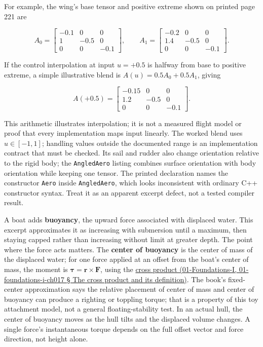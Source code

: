 For example, the wing's base tensor and positive extreme shown on printed page 221 are

\[
A_0=\begin{bmatrix}-0.1&0&0\\1&-0.5&0\\0&0&-0.1\end{bmatrix},\qquad
A_1=\begin{bmatrix}-0.2&0&0\\1.4&-0.5&0\\0&0&-0.1\end{bmatrix}.
\]

If the control interpolation at input \(u=+0.5\) is halfway from base to positive extreme, a simple illustrative blend is \(A(u)=0.5A_0+0.5A_1\), giving

\[
A(+0.5)=\begin{bmatrix}-0.15&0&0\\1.2&-0.5&0\\0&0&-0.1\end{bmatrix}.
\]

This arithmetic illustrates interpolation; it is not a measured flight model or proof that every implementation maps input linearly. The worked blend uses \(u\in[-1,1]\); handling values outside the documented range is an implementation contract that must be checked. Its sail and rudder also change orientation relative to the rigid body; the \texttt{AngledAero} listing combines surface orientation with body orientation while keeping one tensor. The printed declaration names the constructor \texttt{Aero} inside \texttt{AngledAero}, which looks inconsistent with ordinary C++ constructor syntax. Treat it as an apparent excerpt defect, not a tested compiler result.

A boat adds \textbf{buoyancy}, the upward force associated with displaced water. This excerpt approximates it as increasing with submersion until a maximum, then staying capped rather than increasing without limit at greater depth. The point where the force acts matters. The \textbf{center of buoyancy} is the center of mass of the displaced water; for one force applied at an offset from the boat's center of mass, the moment is \(\boldsymbol{\tau}=\mathbf{r}\times\mathbf{F}\), using the \href{}{cross product (01-Foundations-I, 01-foundations-i-ch017 § The cross product and its definition)}. The book's fixed-center approximation says the relative placement of center of mass and center of buoyancy can produce a righting or toppling torque; that is a property of this toy attachment model, not a general floating-stability test. In an actual hull, the center of buoyancy moves as the hull tilts and the displaced volume changes. A single force's instantaneous torque depends on the full offset vector and force direction, not height alone.

